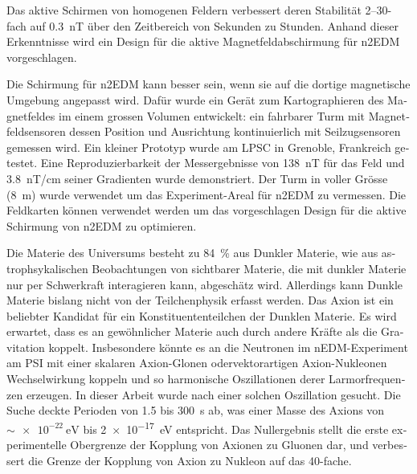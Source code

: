 \begin{otherlanguage}{german}
Das aktive Schirmen von homogenen Feldern verbessert deren Stabilität 2--30-fach auf \SI{0.3}{nT} über den Zeitbereich von Sekunden zu Stunden.
Anhand dieser Erkenntnisse wird ein Design für die aktive Magnetfeldabschirmung für n2EDM vorgeschlagen.

Die Schirmung für n2EDM kann besser sein, wenn sie auf die dortige magnetische Umgebung angepasst wird.
Dafür wurde ein Gerät zum Kartographieren des Magnetfeldes im einem grossen Volumen entwickelt: ein fahrbarer Turm mit Magnetfeldsensoren dessen Position und Ausrichtung kontinuierlich mit Seilzugsensoren gemessen wird.
Ein kleiner Prototyp wurde am LPSC in Grenoble, Frankreich getestet. Eine Reproduzierbarkeit der Messergebnisse von \SI{138}{nT} für das Feld und \SI{3.8}{nT/cm} seiner Gradienten wurde demonstriert.
Der Turm in voller Grösse  (\SI{8}{m}) wurde verwendet um das Experiment-Areal für n2EDM zu vermessen.
Die Feldkarten können verwendet werden um das vorgeschlagen Design für die aktive Schirmung von n2EDM zu optimieren.


Die Materie des Universums besteht zu \SI{84}{\percent} aus Dunkler Materie, wie aus astrophsykalischen Beobachtungen von sichtbarer Materie, die mit dunkler Materie nur per Schwerkraft interagieren kann, abgeschätz wird.
Allerdings kann Dunkle Materie bislang nicht von der Teilchenphysik erfasst werden.
Das Axion ist ein beliebter Kandidat für ein Konstituententeilchen der Dunklen Materie.
Es wird erwartet, dass es an gewöhnlicher Materie auch durch andere Kräfte als die Gravitation koppelt.
Insbesondere könnte es an die Neutronen im nEDM-Experiment am PSI mit einer skalaren Axion-Glonen odervektorartigen Axion-Nukleonen Wechselwirkung koppeln und so harmonische Oszillationen derer Larmorfrequenzen erzeugen.
In dieser Arbeit wurde nach einer solchen Oszillation gesucht.
Die Suche deckte Perioden von \num{1.5} bis \SI{300}{\second} ab, was einer Masse des Axions von $\sim \SI{e-22}{\electronvolt}$ bis \SI{2e-17}{\electronvolt} entspricht.
Das Nullergebnis stellt die erste experimentelle Obergrenze der Kopplung von Axionen zu Gluonen dar, und verbessert die Grenze der Kopplung von Axion zu Nukleon auf das 40-fache.

\end{otherlanguage}

\endgroup

\vfill
